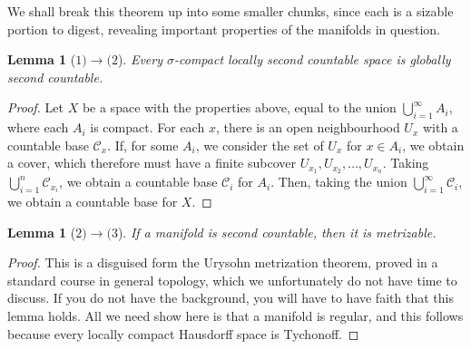 \documentclass[12pt]{report}
\theoremstyle{plain}
\newtheorem{lemma}[theorem]{Lemma}
\theoremstyle{definition}
\begin{document}
We shall break this theorem up into some smaller chunks, since each is a sizable portion to digest, revealing important properties of the manifolds in question.

\begin{lemma}[$1) \to (2$]
    Every $\sigma$-compact locally second countable space is globally second countable.
\end{lemma}
\begin{proof}
    Let $X$ be a space with the properties above, equal to the union $\bigcup_{i = 1}^\infty A_i$, where each $A_i$ is compact. For each $x$, there is an open neighbourhood $U_x$ with a countable base $\mathcal{C}_x$. If, for some $A_i$, we consider the set of $U_x$ for $x \in A_i$, we obtain a cover, which therefore must have a finite subcover $U_{x_1}, U_{x_2}, \dots, U_{x_n}$. Taking $\bigcup_{i = 1}^n \mathcal{C}_{x_i}$, we obtain a countable base $\mathcal{C}_i$ for $A_i$. Then, taking the union $\bigcup_{i = 1}^\infty \mathcal{C}_i$, we obtain a countable base for $X$.
\end{proof}

\begin{lemma}[$2) \to (3$]
    If a manifold is second countable, then it is metrizable.
\end{lemma}
\begin{proof}
    This is a disguised form the Urysohn metrization theorem, proved in a standard course in general topology, which we unfortunately do not have time to discuss. If you do not have the background, you will have to have faith that this lemma holds. All we need show here is that a manifold is regular, and this follows because every locally compact Hausdorff space is Tychonoff.
\end{proof}
\end{document}
